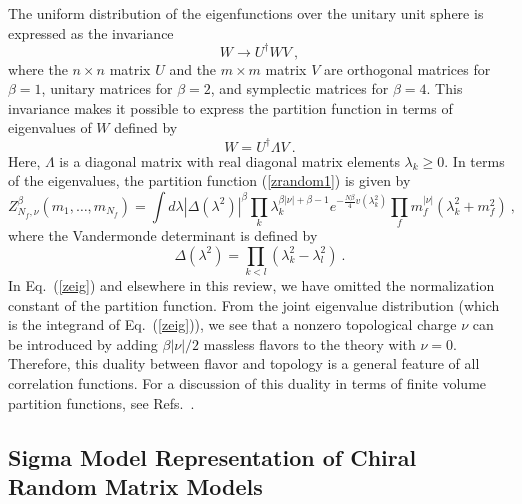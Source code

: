 The uniform distribution of the eigenfunctions over the unitary unit
sphere is expressed as the invariance
\begin{equation}
  W \rightarrow U^\dagger W V\:,
\label{inv}
\end{equation}
where the $n\times n$ matrix $U$ and the $m\times m$ matrix $V$ are
orthogonal matrices for $\beta=1$, unitary matrices for $\beta = 2$,
and symplectic matrices for $\beta = 4$. This invariance makes it
possible to express the partition function in terms of eigenvalues of
$W$ defined by
\begin{equation}
  W = U^\dagger \Lambda V\:.
\end{equation}
Here, $\Lambda$ is a diagonal matrix with real diagonal matrix
elements $\lambda_k \ge 0$.  In terms of the eigenvalues, the partition
function (\ref{zrandom1}) is given by
\begin{equation}
  Z_{N_f, \nu}^{\beta}(m_1, \ldots, m_{N_f}) = 
  \int d\lambda |\Delta(\lambda^2)|^\beta
  \prod_k \lambda_k^{\beta|\nu|+\beta-1} 
  e^{-\frac{N\beta}4 v(\lambda_k^2)}
  \prod_f m_f^{|\nu|}(\lambda_k^2 + m^2_f)\:,
  \label{zeig}
\end{equation}
where the Vandermonde determinant is defined by
\begin{equation}
  \Delta(\lambda^2) = \prod_{k<l} (\lambda_k^2-\lambda_l^2)\:.
  \label{vandermonde}
\end{equation}
In Eq.~(\ref{zeig}) and elsewhere in this review, we have omitted the
normalization constant of the partition function.  {}From the joint
eigenvalue distribution (which is the integrand of Eq.~(\ref{zeig})),
we see that a nonzero topological charge $\nu$ can be introduced by
adding $\beta|\nu|/2$ massless flavors to the theory with $\nu=0$.
Therefore, this duality between flavor and topology is a general
feature of all correlation functions.  For a discussion of this
duality in terms of finite volume partition functions, see
Refs.~\cite{cam97,wadati}. 

\subsection{Sigma Model Representation of Chiral Random Matrix Models}

